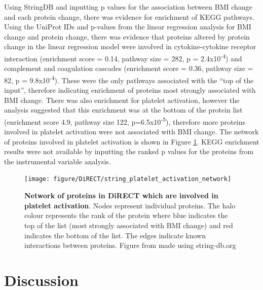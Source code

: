 \documentclass[11pt,twoside]{bristolthesis}
\newcommand{\blandscape}{\begin{landscape}}
\newcommand{\elandscape}{\end{landscape}}
\begin{document}
Using StringDB and inputting p values for the association between BMI change and each protein change, there was evidence for enrichment of KEGG pathways. Using the UniProt IDs and p-values from the linear regression analysis for BMI change and protein change, there was evidence that proteins altered by protein change in the linear regression model were involved in cytokine-cytokine receptor interaction (enrichment score = 0.14, pathway size = 282, p = 2.4x10\textsuperscript{-4}) and complement and coagulation cascades (enrichment score = 0.36, pathway size = 82, p = 9.8x10\textsuperscript{-4}). These were the only pathways associated with the ``top of the input'', therefore indicating enrichment of proteins most strongly associated with BMI change. There was also enrichment for platelet activation, however the analysis suggested that this enrichment was at the bottom of the protein list (enrichment score 4.9, pathway size 122, p=6.5x10\textsuperscript{-5}), therefore more proteins involved in platelet activation were not associated with BMI change. The network of proteins involved in platelet activation is shown in Figure \ref{fig:platelet-enrichment}. KEGG enrichment results were not available by inputting the ranked p values for the proteins from the instrumental variable analysis.

\blandscape
\thispagestyle{empty}




\begin{figure}

{\centering \texttt{[image: figure/DiRECT/string\_platelet\_activation\_network]} 

}

\caption[Network of proteins in DiRECT which are involved in platelet activation.]{\textbf{Network of proteins in DiRECT which are involved in platelet activation}. Nodes represent individual proteins. The halo colour represents the rank of the protein where blue indicates the top of the list (most strongly associated with BMI change) and red indicates the bottom of the list. The edges indicate known interactions between proteins. Figure from made using string-db.org}\label{fig:platelet-enrichment}
\end{figure}
\elandscape

\hypertarget{discussion-4}{%
\section{Discussion}\label{discussion-4}}
\end{document}
